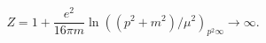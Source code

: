 \begin{equation}
Z=1+\frac{e^{2}}{16\pi m}\ln((p^{2}+m^{2})/\mu^{2})_{p^{2}\infty}%
\rightarrow\infty.
\end{equation}

